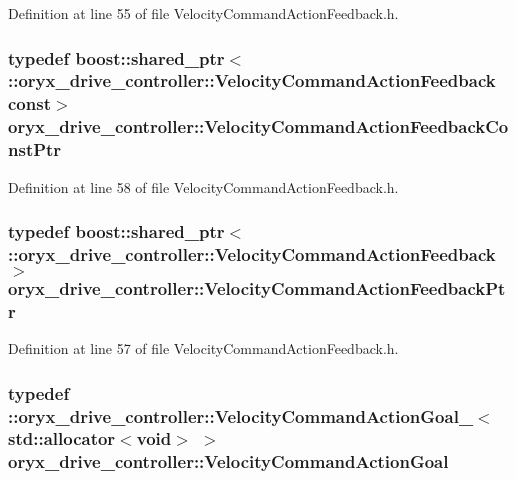 \-Definition at line 55 of file \-Velocity\-Command\-Action\-Feedback.\-h.

\subsubsection[{\-Velocity\-Command\-Action\-Feedback\-Const\-Ptr}]{\setlength{\rightskip}{0pt plus 5cm}typedef boost\-::shared\-\_\-ptr$<$ \-::{\bf oryx\-\_\-drive\-\_\-controller\-::\-Velocity\-Command\-Action\-Feedback} const$>$ {\bf oryx\-\_\-drive\-\_\-controller\-::\-Velocity\-Command\-Action\-Feedback\-Const\-Ptr}}\label{namespaceoryx__drive__controller_a532014c871ca5c689f407ef26d0121d4}


\-Definition at line 58 of file \-Velocity\-Command\-Action\-Feedback.\-h.

\subsubsection[{\-Velocity\-Command\-Action\-Feedback\-Ptr}]{\setlength{\rightskip}{0pt plus 5cm}typedef boost\-::shared\-\_\-ptr$<$ \-::{\bf oryx\-\_\-drive\-\_\-controller\-::\-Velocity\-Command\-Action\-Feedback}$>$ {\bf oryx\-\_\-drive\-\_\-controller\-::\-Velocity\-Command\-Action\-Feedback\-Ptr}}\label{namespaceoryx__drive__controller_a9ceb07bd7af459f1213857dec1753f3e}


\-Definition at line 57 of file \-Velocity\-Command\-Action\-Feedback.\-h.

\subsubsection[{\-Velocity\-Command\-Action\-Goal}]{\setlength{\rightskip}{0pt plus 5cm}typedef \-::{\bf oryx\-\_\-drive\-\_\-controller\-::\-Velocity\-Command\-Action\-Goal\-\_\-}$<$std\-::allocator$<$void$>$ $>$ {\bf oryx\-\_\-drive\-\_\-controller\-::\-Velocity\-Command\-Action\-Goal}}\label{namespaceoryx__drive__controller_a4da6b120171aa0861ebc7096ae19102a}


